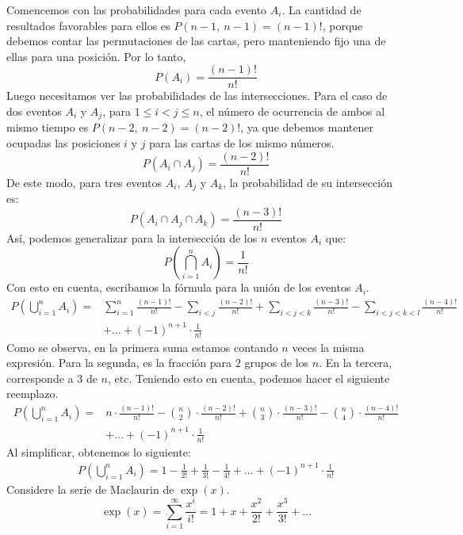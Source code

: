 \documentclass[12pt]{article}
\begin{document}
Comencemos con las probabilidades para cada evento $A_{i}$. La cantidad de resultados favorables para ellos es $P(n - 1, \ n - 1) = (n - 1)!$, porque debemos contar las permutaciones de las cartas, pero manteniendo fijo una de ellas para una posición. Por lo tanto,
\[
  P(A_{i}) = \frac{(n - 1)!}{n!}
\]
Luego necesitamos ver las probabilidades de las intersecciones. Para el caso de dos eventos $A_{i}$ y $A_{j}$, para $1 \leq i < j \leq n$, el número de ocurrencia de ambos al mismo tiempo es $P(n - 2, \ n - 2) = (n - 2)!$, ya que debemos mantener ocupadas las posiciones $i$ y $j$ para las cartas de los mismo números.
\[
  P(A_{i} \cap A_{j}) = \frac{(n - 2)!}{n!}
\]
De este modo, para tres eventos $A_{i}, \ A_{j}$ y $A_{k}$, la probabilidad de su intersección es:
\[
  P(A_{i} \cap A_{j} \cap A_{k}) = \frac{(n - 3)!}{n!}
\]
Así, podemos generalizar para la intersección de los $n$ eventos $A_{i}$ que:
\[
  P\left(\bigcap_{i = 1}^{n} A_{i}\right) = \frac{1}{n!}
\]
Con esto en cuenta, escribamos la fórmula para la unión de los eventos $A_{i}$.
\begin{align*}
  P\left(\bigcup_{i = 1}^{n} A_{i}\right) = &\sum_{i = 1}^{n} \frac{(n - 1)!}{n!} - \sum_{i < j} \frac{(n - 2)!}{n!} +
                                            \sum_{i < j < k} \frac{(n - 3)!}{n!} - \sum_{i < j < k < l} \frac{(n - 4)!}{n!} \\
                                            & + \ldots + (-1)^{n + 1} \cdot \frac{1}{n!}
\end{align*}
Como se observa, en la primera suma estamos contando $n$ veces la misma expresión. Para la segunda, es la fracción para $2$ grupos de los $n$. En la tercera, corresponde a $3$ de $n$, etc. Teniendo esto en cuenta, podemos hacer el siguiente reemplazo.
\begin{align*}
  P\left(\bigcup_{i = 1}^{n} A_{i}\right) = & n \cdot \frac{(n - 1)!}{n!} - \binom{n}{2} \cdot \frac{(n - 2)!}{n!} +
                                            \binom{n}{3} \cdot \frac{(n - 3)!}{n!} - \binom{n}{4} \cdot \frac{(n - 4)!}{n!} \\
                                            & + \ldots + (-1)^{n + 1} \cdot \frac{1}{n!}
\end{align*}
Al simplificar, obtenemos lo siguiente:
\begin{align*}
  P\left(\bigcup_{i = 1}^{n} A_{i}\right) = 1 - \frac{1}{2!} + \frac{1}{3!} - \frac{1}{4!} + \ldots + (-1)^{n + 1} \cdot \frac{1}{n!}
\end{align*}
Considere la serie de Maclaurin de $\exp(x)$.
\[
  \exp(x) = \sum_{i = 1}^{\infty} \frac{x^{i}}{i!} = 1 + x + \frac{x^{2}}{2!} + \frac{x^{3}}{3!} + \ldots
\]
\end{document}

